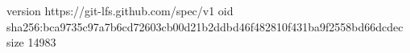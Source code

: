 version https://git-lfs.github.com/spec/v1
oid sha256:bca9735c97a7b6cd72603cb00d21b2ddbd46f482810f431ba9f2558bd66dcdec
size 14983
